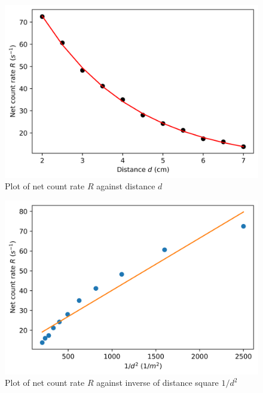 \documentclass[%
 reprint,
nofootinbib,
 amsmath,amssymb,
 aps,
floatfix,
]{revtex4-2}
\begin{document}
        \begin{figure}
            \centering
            \includegraphics[scale = 0.63]{Figures/plot-invsq-1.png}
            \caption{Plot of net count rate $R$ against distance $d$}
            \label{fig:invsq-1}
        \end{figure}
        \begin{figure}
            \centering
            \includegraphics[scale = 0.63]{Figures/plot-invsq-2.png}
            \caption{Plot of net count rate $R$ against inverse of distance square $1/d^2$}
            \label{fig:invsq-2}
        \end{figure}
\end{document}
